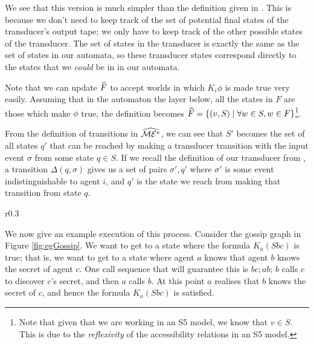\documentclass[10pt, a4paper]{report}
\begin{document}
We see that this version is much simpler than the definition given in
. This is because we don't need to keep track of the
set of potential final states of the transducer's output tape; we only have to
keep track of the other possible states of the transducer. The set of states in
the transducer is exactly the same as the set of states in our \mestar automata,
so these transducer states correspond directly to the states that we
\emph{could} be in in our \mestar automata.

Note that we can update $\widehat{F}$ to accept worlds in which $K_i \phi$ is made
true very easily. Assuming that in the automaton the layer below, all the states
in $F$ are those which make $\phi$ true, the definition becomes $\widehat{F} =
\left\{ (v, S) \mid \forall w \in S, w \in F \right\}$\footnote{Note that given
  that we are working in an \textsf{S5} model, we know that $v \in S$. This is
  due to the \emph{reflexivity} of the accessibility relations in an \textsf{S5}
model.}.

From the definition of transitions in $\widehat{\mathcal{ME^\ast}}$, we can see that 
$S'$ becomes the set of all states $q'$ that can be reached by making a
transducer transition with the input event $\sigma$ from some state $q \in S$.
If we recall the definition of our transducer from
, a transition $\Delta(q, \sigma)$ gives
us a set of pairs $\sigma', q'$ where $\sigma'$ is some event indistinguishable
to agent $i$, and $q'$ is the state we reach from making that transition from
state $q$. 

\bigskip \bigskip \bigskip


\begin{wrapfigure}{r}{0.3\textwidth}
  \centering
  \caption{}
  \label{fig:egGossip}
\end{wrapfigure}

We now give an example execution of this process. Consider the gossip graph in
Figure \ref{fig:egGossip}. We want to get to a state where the formula $K_a
(Sbc)$ is true; that is, we want to get to a state where agent $a$ knows that
agent $b$ knows the secret of agent $c$. One call sequence that will guarantee
this is $bc; ab$; $b$ calls $c$ to discover $c$'s secret, and then $a$ calls
$b$. At this point $a$ realises that $b$ knows the secret of $c$, and hence the
formula $K_a (Sbc)$ is satisfied. 
\end{document}
